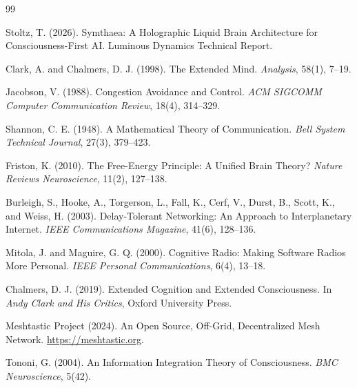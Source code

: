 \documentclass[11pt,twocolumn]{article}
\begin{document}
\begin{thebibliography}{99}

Stoltz, T. (2026).
Symthaea: A Holographic Liquid Brain Architecture for Consciousness-First AI.
Luminous Dynamics Technical Report.

Clark, A. and Chalmers, D. J. (1998).
The Extended Mind.
\textit{Analysis}, 58(1), 7--19.

Jacobson, V. (1988).
Congestion Avoidance and Control.
\textit{ACM SIGCOMM Computer Communication Review}, 18(4), 314--329.

Shannon, C. E. (1948).
A Mathematical Theory of Communication.
\textit{Bell System Technical Journal}, 27(3), 379--423.

Friston, K. (2010).
The Free-Energy Principle: A Unified Brain Theory?
\textit{Nature Reviews Neuroscience}, 11(2), 127--138.

Burleigh, S., Hooke, A., Torgerson, L., Fall, K., Cerf, V., Durst, B.,
Scott, K., and Weiss, H. (2003).
Delay-Tolerant Networking: An Approach to Interplanetary Internet.
\textit{IEEE Communications Magazine}, 41(6), 128--136.

Mitola, J. and Maguire, G. Q. (2000).
Cognitive Radio: Making Software Radios More Personal.
\textit{IEEE Personal Communications}, 6(4), 13--18.

Chalmers, D. J. (2019).
Extended Cognition and Extended Consciousness.
In \textit{Andy Clark and His Critics}, Oxford University Press.

Meshtastic Project (2024).
An Open Source, Off-Grid, Decentralized Mesh Network.
\url{https://meshtastic.org}.

Tononi, G. (2004).
An Information Integration Theory of Consciousness.
\textit{BMC Neuroscience}, 5(42).

\end{thebibliography}
\end{document}
